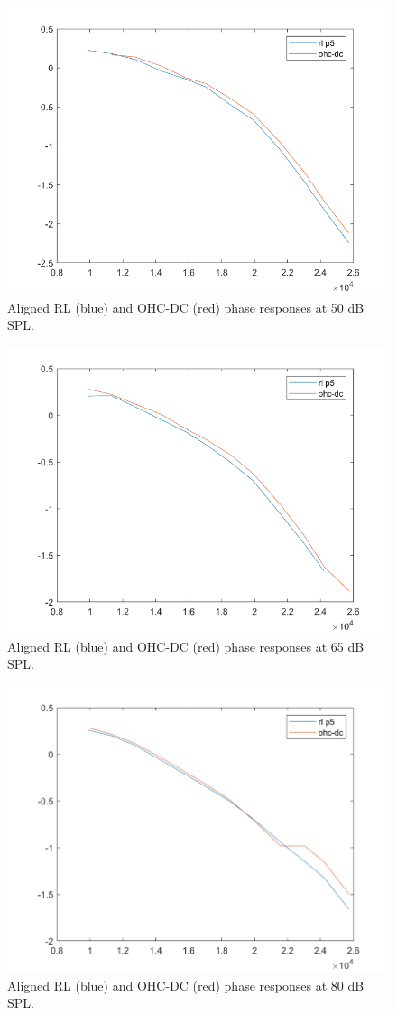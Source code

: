 \documentclass{article}
\begin{document}
\begin{figure}
	\centering
	\includegraphics[width=.7\textwidth]{Figures/rldc50.png}
	\caption{Aligned RL (blue) and OHC-DC (red) phase responses at 50 dB SPL.}
	\label{rldc50}
\end{figure}

\begin{figure}
	\centering
	\includegraphics[width=.7\textwidth]{Figures/rldc65.png}
	\caption{Aligned RL (blue) and OHC-DC (red) phase responses at 65 dB SPL.}
	\label{rldc65}
\end{figure}

\begin{figure}
	\centering
	\includegraphics[width=.7\textwidth]{Figures/rldc80.png}
	\caption{Aligned RL (blue) and OHC-DC (red) phase responses at 80 dB SPL.}
	\label{rldc80}
\end{figure}
\end{document}
